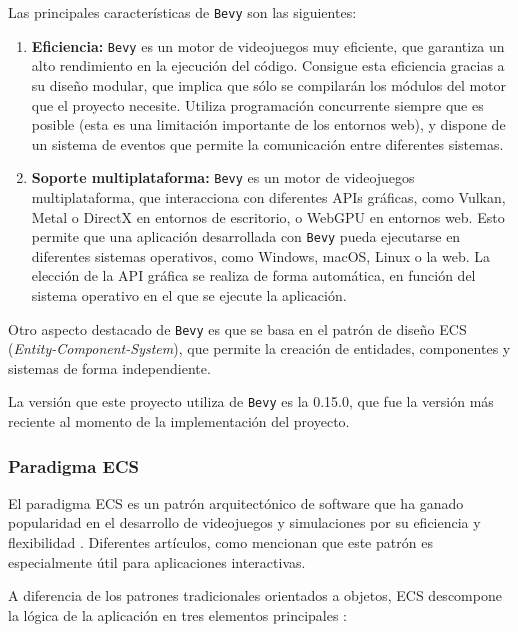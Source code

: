 Las principales características de \texttt{Bevy} son las siguientes:
\begin{enumerate}
    \item \textbf{Eficiencia:} \texttt{Bevy} es un motor de videojuegos muy eficiente, que garantiza un alto rendimiento en la ejecución del código. Consigue esta eficiencia gracias a su diseño modular, que implica que sólo se compilarán los módulos del motor que el proyecto necesite. Utiliza programación concurrente siempre que es posible (esta es una limitación importante de los entornos web), y dispone de un sistema de eventos que permite la comunicación entre diferentes sistemas.
    \item \textbf{Soporte multiplataforma:} \texttt{Bevy} es un motor de videojuegos multiplataforma, que interacciona con diferentes APIs gráficas, como Vulkan, Metal o DirectX en entornos de escritorio, o WebGPU en entornos web. Esto permite que una aplicación desarrollada con \texttt{Bevy} pueda ejecutarse en diferentes sistemas operativos, como Windows, macOS, Linux o la web. La elección de la API gráfica se realiza de forma automática, en función del sistema operativo en el que se ejecute la aplicación.
\end{enumerate}

Otro aspecto destacado de \texttt{Bevy} es que se basa en el patrón de diseño ECS (\textit{Entity-Component-System}), que permite la creación de entidades, componentes y sistemas de forma independiente. 

La versión que este proyecto utiliza de \texttt{Bevy} es la 0.15.0, que fue la versión más reciente al momento de la implementación del proyecto.

\subsubsection{Paradigma \acs{ECS}} \label{subsec:ecs}

El paradigma \ac{ECS} es un patrón arquitectónico de software que ha ganado popularidad en el desarrollo de videojuegos y simulaciones por su eficiencia y flexibilidad \autocite{prdevingDeepdivingEntityComponent2023}. Diferentes artículos, como \autocite{zaksWhenNotUse2018} mencionan que este patrón es especialmente útil para aplicaciones interactivas.

A diferencia de los patrones tradicionales orientados a objetos, \ac{ECS} descompone la lógica de la aplicación en tres elementos principales \autocite{SistemaComponentesEntidad2024}:

